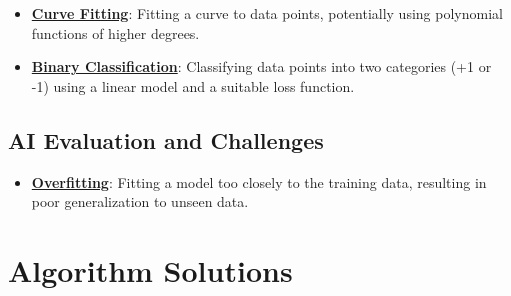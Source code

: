\documentclass{article}%
\begin{document}
\begin{itemize}[leftmargin=*]
\item \href{https://purdue.brightspace.com/d2l/common/assets/pdfjs-d2l-dist/1.0.14-legacy/web/viewer.html?file=\%2Fcontent\%2Fenforced\%2F1095467-wl.202510.CS.24300.001\%2F05L2-ML Basics.pdf\%3Fou\%3D1095467\&lang=en-us\&container=d2l-fileviewer-rendered-pdf\&fullscreen=d2l-fileviewer-rendered-pdf-dialog\&height=667#page=13}{\textbf{Curve Fitting}}: Fitting a curve to data points, potentially using polynomial functions of higher degrees.%
\item \href{https://purdue.brightspace.com/d2l/common/assets/pdfjs-d2l-dist/1.0.14-legacy/web/viewer.html?file=\%2Fcontent\%2Fenforced\%2F1095467-wl.202510.CS.24300.001\%2F05L2-ML Basics.pdf\%3Fou\%3D1095467\&lang=en-us\&container=d2l-fileviewer-rendered-pdf\&fullscreen=d2l-fileviewer-rendered-pdf-dialog\&height=667#page=20}{\textbf{Binary Classification}}: Classifying data points into two categories (+1 or {-}1) using a linear model and a suitable loss function.%
\end{itemize}

%
\subsection{AI Evaluation and Challenges}%
\label{subsec:AIEvaluationandChallenges}%
\begin{itemize}[leftmargin=*]%
\item \href{https://purdue.brightspace.com/d2l/common/assets/pdfjs-d2l-dist/1.0.14-legacy/web/viewer.html?file=\%2Fcontent\%2Fenforced\%2F1095467-wl.202510.CS.24300.001\%2F05L2-ML Basics.pdf\%3Fou\%3D1095467\&lang=en-us\&container=d2l-fileviewer-rendered-pdf\&fullscreen=d2l-fileviewer-rendered-pdf-dialog\&height=667#page=14}{\textbf{Overfitting}}: Fitting a model too closely to the training data, resulting in poor generalization to unseen data.%
\end{itemize}

%
\section{Algorithm Solutions}%
\label{sec:AlgorithmSolutions}%
\end{document}
